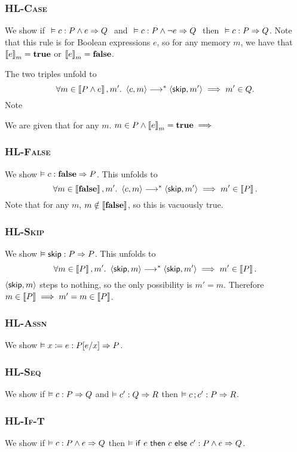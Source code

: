 \documentclass[10pt]{article}
\theoremstyle{definition}
\begin{document}
\subsubsection*{\textsc{HL-Case}}
We show if $\ \VAL \Triple c : P \wedge e => Q\ $ and
      $\ \VAL \Triple c : P \wedge \neg e => Q\ $ then
    $\ \VAL \Triple c : P => Q$.
Note that this rule is for Boolean expressions $e$,
so for any memory $m$, we have that $\Eval(e,m) = \True$
or $\Eval(e,m) = \False$.

The two triples unfold to
\[
    \forall m \in \Interp{P \wedge e}, m'.\
    \Cfg(c, m) \sstepstotrans \Cfg(\Skip, m') 
    \implies m' \in Q.
\]
Note

We are given that for any $m$. $m \in P \wedge \Eval(e,m) = \True \implies $
\todo{todo}

\subsubsection*{\textsc{HL-False}}
We show $\VAL \Triple c : \EFalse => P$.
This unfolds to
\[
    \forall m \in \Interp{\EFalse}, m'.\
    \Cfg(c, m) \sstepstotrans \Cfg(\Skip, m') 
    \implies m' \in \Interp{P}.
\]
Note that for any $m$, $m \notin \left\llbracket \textbf{false} \right\rrbracket$,
so this is vacuously true.

\subsubsection*{\textsc{HL-Skip}}
We show $\VAL \Triple \Skip : P => P$.
This unfolds to 
$$\forall m \in \Interp{P}, m'.\
\Cfg(\Skip,m) \sstepstotrans \Cfg(\Skip,m') \implies
m' \in \Interp{P}.$$
$\Cfg(\Skip,m)$ steps to nothing,
so the only possibility is $m' = m$.
Therefore $m \in \left\llbracket P \right\rrbracket \implies m' = m \in \left\llbracket P \right\rrbracket$.

\subsubsection*{\textsc{HL-Assn}}
We show $\VAL \Triple \Assn x = e : \Subst P[e/x] => P$.

\subsubsection*{\textsc{HL-Seq}}
We show if $\VAL \Triple c : P => Q$ and $\VAL \Triple c' : Q => R$
then $\VAL \Triple \Seq c;c' : P => R$.
    
\subsubsection*{\textsc{HL-If-T}}
We show if $\VAL \Triple c : P \wedge e => Q$ then
    $\VAL \Triple \ITE e then c else c' : P \wedge e => Q$.
\todo{todo}
\end{document}
